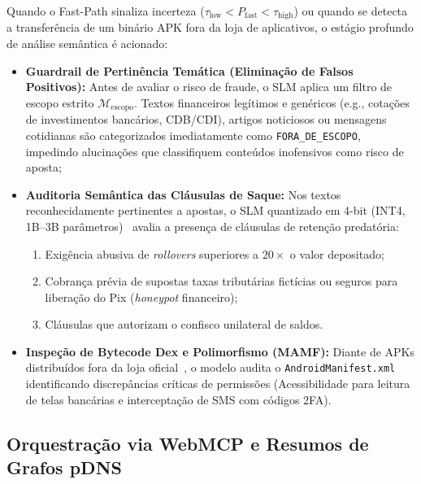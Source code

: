 Quando o Fast-Path sinaliza incerteza ($\tau_{\text{low}} < P_{\text{fast}} < \tau_{\text{high}}$) ou quando se detecta a transfer\^{e}ncia de um bin\'{a}rio APK fora da loja de aplicativos, o est\'{a}gio profundo de an\'{a}lise sem\^{a}ntica \'{e} acionado:
\begin{itemize}
    \item \textbf{Guardrail de Pertin\^{e}ncia Tem\'{a}tica (Elimina\c{c}\~{a}o de Falsos Positivos):} Antes de avaliar o risco de fraude, o SLM aplica um filtro de escopo estrito $\mathcal{M}_{\text{escopo}}$. Textos financeiros leg\'{i}timos e gen\'{e}ricos (e.g., cota\c{c}\~{o}es de investimentos banc\'{a}rios, CDB/CDI), artigos noticiosos ou mensagens cotidianas s\~{a}o categorizados imediatamente como \texttt{FORA\_DE\_ESCOPO}, impedindo alucina\c{c}\~{o}es que classifiquem conte\'{u}dos inofensivos como risco de aposta;
    \item \textbf{Auditoria Sem\^{a}ntica das Cl\'{a}usulas de Saque:} Nos textos reconhecidamente pertinentes a apostas, o SLM quantizado em 4-bit (INT4, 1B--3B par\^{a}metros)~\cite{liu2024mobilellm} avalia a presen\c{c}a de cl\'{a}usulas de reten\c{c}\~{a}o predat\'{o}ria:
    \begin{enumerate}
        \item Exig\^{e}ncia abusiva de \textit{rollovers} superiores a $20\times$ o valor depositado;
        \item Cobran\c{c}a pr\'{e}via de supostas taxas tribut\'{a}rias fict\'{i}cias ou seguros para libera\c{c}\~{a}o do Pix (\textit{honeypot} financeiro);
        \item Cl\'{a}usulas que autorizam o confisco unilateral de saldos.
    \end{enumerate}
    \item \textbf{Inspe\c{c}\~{a}o de Bytecode Dex e Polimorfismo (MAMF):} Diante de APKs distribu\'{i}dos fora da loja oficial~\cite{li2025automated}, o modelo audita o \texttt{AndroidManifest.xml} identificando discrep\^{a}ncias cr\'{i}ticas de permiss\~{o}es (Acessibilidade para leitura de telas banc\'{a}rias e intercepta\c{c}\~{a}o de SMS com c\'{o}digos 2FA).
\end{itemize}

\subsection{Orquestra\c{c}\~{a}o via WebMCP e Resumos de Grafos pDNS}

